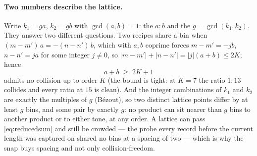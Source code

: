 \documentclass[11pt,a4paper]{article}
\begin{document}
\paragraph{Two numbers describe the lattice.} Write $k_1 = g a$,
$k_2 = g b$ with $\gcd(a, b) = 1$: the  $a : b$ and
the  $g = \gcd(k_1, k_2)$. They answer two
different questions. Two recipes share a bin when
$(m - m')\,a = -(n - n')\,b$, which with $a, b$ coprime forces
$m - m' = -jb$, $n - n' = ja$ for some integer $j \ne 0$, so
$|m - m'| + |n - n'| = |j|(a + b) \le 2K$; hence
\begin{equation}
  a + b \;\ge\; 2K + 1
  \label{eq:reducedsum}
\end{equation}
admits no collision up to order $K$ (the bound is tight: at $K = 7$ the
ratio $1 : 13$ collides and every ratio at $15$ is clean). And the integer
combinations of $k_1$ and $k_2$ are exactly the multiples of $g$ (Bézout),
so two distinct lattice points differ by at least $g$ bins, and some pair
by exactly $g$: no product can sit nearer than $g$ bins to another product
or to either tone, at any order. A lattice can pass \eqref{eq:reducedsum}
and still be crowded --- the probe every record before the current
length was captured on shared no bins at a spacing of two --- which is
why the snap buys spacing and not only collision-freedom.
\end{document}
